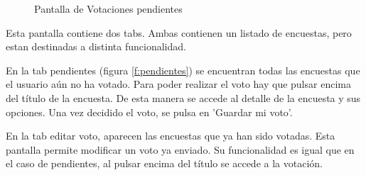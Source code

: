 \documentclass[a4paper, 12pt]{book}
\begin{document}
\begin{figure}[H]
 \centering
 \caption{Pantalla de Votaciones pendientes}
 \label{f:votaciones_pendientes}
\end{figure}

Esta pantalla contiene dos tabs. Ambas contienen un listado de encuestas, pero estan destinadas a distinta funcionalidad.

En la tab pendientes (figura \ref{f:pendientes}) se encuentran todas las encuestas que el usuario a\'un no ha votado. Para poder
realizar el voto hay que pulsar encima del t\'itulo de la encuesta. De esta manera se accede al detalle de la encuesta y sus opciones.
Una vez decidido el voto, se pulsa en 'Guardar mi voto'.

En la tab editar voto, aparecen las encuestas que ya han sido votadas. Esta pantalla permite modificar un voto ya enviado. Su funcionalidad
es igual que en el caso de pendientes, al pulsar encima del t\'itulo se accede a la votaci\'on.
\end{document}
